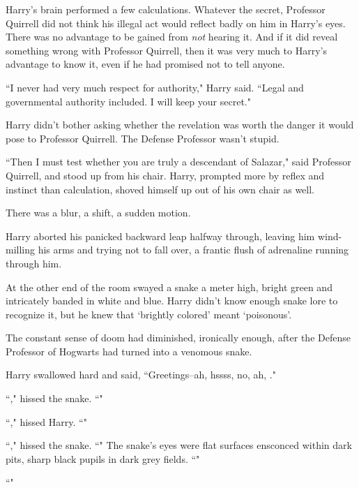 Harry's brain performed a few calculations. Whatever the secret, Professor Quirrell did not think his illegal act would reflect badly on him in Harry's eyes. There was no advantage to be gained from \emph{not} hearing it. And if it did reveal something wrong with Professor Quirrell, then it was very much to Harry's advantage to know it, even if he had promised not to tell anyone.

``I never had very much respect for authority," Harry said. ``Legal and governmental authority included. I will keep your secret."

Harry didn't bother asking whether the revelation was worth the danger it would pose to Professor Quirrell. The Defense Professor wasn't stupid.

``Then I must test whether you are truly a descendant of Salazar," said Professor Quirrell, and stood up from his chair. Harry, prompted more by reflex and instinct than calculation, shoved himself up out of his own chair as well.

There was a blur, a shift, a sudden motion.

Harry aborted his panicked backward leap halfway through, leaving him wind-milling his arms and trying not to fall over, a frantic flush of adrenaline running through him.

At the other end of the room swayed a snake a meter high, bright green and intricately banded in white and blue. Harry didn't know enough snake lore to recognize it, but he knew that `brightly colored' meant `poisonous'.

The constant sense of doom had diminished, ironically enough, after the Defense Professor of Hogwarts had turned into a venomous snake.

Harry swallowed hard and said, ``Greetings\---ah, hssss, no, ah, ."

``," hissed the snake. ``"

``," hissed Harry. ``"

``," hissed the snake. ``" The snake's eyes were flat surfaces ensconced within dark pits, sharp black pupils in dark grey fields. ``"

``"

